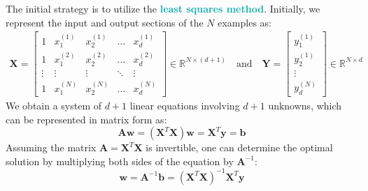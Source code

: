 \documentclass[twoside]{article}
\newcommand{\highlightbluetext}[1]{\textcolor[HTML]{09ACA6}{\textbf{#1}}}
\numberwithin{equation}{section}
\begin{document}
	The initial strategy is to utilize the \highlightbluetext{least squares method}. Initially, we represent the input and output sections of the $N$ examples as:
	\begin{align*}
		\mathbf{X} = \begin{bmatrix}
			1 & x_1^{(1)} & x_2^{(1)} & \ldots & x_d^{(1)} \\
			1 & x_1^{(2)} & x_2^{(2)} & \ldots & x_d^{(2)} \\
			\vdots & \vdots & \vdots & \ddots & \vdots \\
			1 & x_1^{(N)} & x_2^{(N)} & \ldots & x_d^{(N)}
		\end{bmatrix} \in \mathbb{R}^{N \times (d + 1)} \quad \text{and} \quad
		\mathbf{Y} = \begin{bmatrix}
			y_1^{(1)} \\
			y_2^{(1)} \\
			\vdots \\
			y_d^{(N)}
		\end{bmatrix} \in \mathbb{R}^{N \times d}
	\end{align*}
	We obtain a system of $d + 1$ linear equations involving $d + 1$ unknowns, which can be represented in matrix form as:
	\begin{equation}
	\label{eq:MultiOutputRegressionMatrixForm}
	\boxed{\mathbf{Aw} = (\mathbf{X}^T \mathbf{X}) \mathbf{w} = \mathbf{X}^T \mathbf{y} = \mathbf{b}}
	\end{equation}
	Assuming the matrix $\mathbf{A} = \mathbf{X}^T \mathbf{X}$ is invertible, one can determine the optimal solution by multiplying both sides of the equation by $\mathbf{A}^{-1}$:
	\begin{equation}
	\label{eq:MultiOutputRegressionOptimalSolution}
	\boxed{\mathbf{w} = \mathbf{A}^{-1} \mathbf{b} = (\mathbf{X}^T \mathbf{X})^{-1} \mathbf{X}^T \mathbf{y}}
	\end{equation}
\end{document}
